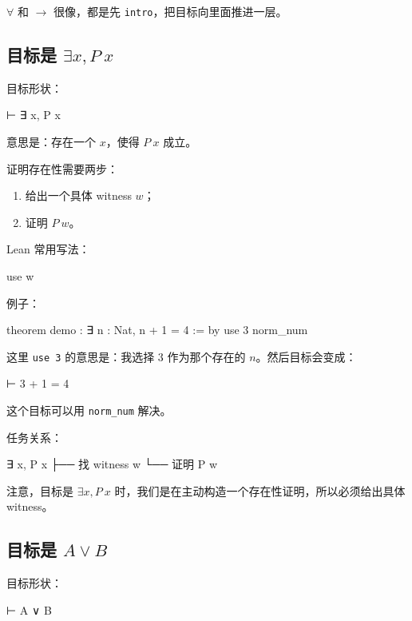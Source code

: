 \documentclass[UTF8,12pt]{ctexart}
\begin{document}
\(\forall\) 和 \(\to\) 很像，都是先 \texttt{intro}，把目标向里面推进一层。

\subsection{目标是 \(\exists x, P\ x\)}

目标形状：

\begin{LeanCode}
⊢ ∃ x, P x
\end{LeanCode}

意思是：存在一个 \(x\)，使得 \(P\ x\) 成立。

证明存在性需要两步：
\begin{enumerate}
  \item 给出一个具体 witness \(w\)；
  \item 证明 \(P\ w\)。
\end{enumerate}

Lean 常用写法：

\begin{LeanCode}
use w
\end{LeanCode}

例子：

\begin{LeanCode}
theorem demo : ∃ n : Nat, n + 1 = 4 := by
  use 3
  norm_num
\end{LeanCode}

这里 \texttt{use 3} 的意思是：我选择 \(3\) 作为那个存在的 \(n\)。然后目标会变成：

\begin{LeanCode}
⊢ 3 + 1 = 4
\end{LeanCode}

这个目标可以用 \texttt{norm\_num} 解决。

任务关系：

\begin{Tree}
∃ x, P x
├── 找 witness w
└── 证明 P w
\end{Tree}

注意，目标是 \(\exists x, P\ x\) 时，我们是在主动构造一个存在性证明，所以必须给出具体 witness。

\subsection{目标是 \(A \lor B\)}

目标形状：

\begin{LeanCode}
⊢ A ∨ B
\end{LeanCode}
\end{document}
